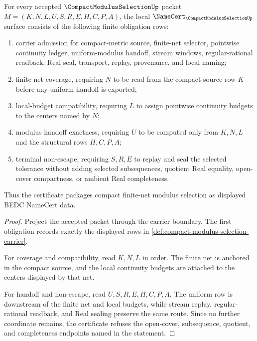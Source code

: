 \begin{theorem}
\label{thm:compact-modulus-selection-namecert}
For every accepted $\CompactModulusSelectionUp$ packet $M=(K,N,L,U,S,R,E,H,C,P,A)$, the local $\NameCert_{\CompactModulusSelectionUp}$ surface consists of the following finite obligation rows:
\begin{enumerate}
\item carrier admission for compact-metric source, finite-net selector, pointwise continuity ledger, uniform-modulus handoff, stream windows, regular-rational readback, Real seal, transport, replay, provenance, and local naming;
\item finite-net coverage, requiring $N$ to be read from the compact source row $K$ before any uniform handoff is exported;
\item local-budget compatibility, requiring $L$ to assign pointwise continuity budgets to the centers named by $N$;
\item modulus handoff exactness, requiring $U$ to be computed only from $K,N,L$ and the structural rows $H,C,P,A$;
\item terminal non-escape, requiring $S,R,E$ to replay and seal the selected tolerance without adding selected subsequences, quotient Real equality, open-cover compactness, or ambient Real completeness.
\end{enumerate}
Thus the certificate packages compact finite-net modulus selection as displayed BEDC NameCert data.
\end{theorem}
\begin{proof}
Project the accepted packet through the carrier boundary. The first obligation records exactly the displayed rows in \autoref{def:compact-modulus-selection-carrier}.

For coverage and compatibility, read $K,N,L$ in order. The finite net is anchored in the compact source, and the local continuity budgets are attached to the centers displayed by that net.

For handoff and non-escape, read $U,S,R,E,H,C,P,A$. The uniform row is downstream of the finite net and local budgets, while stream replay, regular-rational readback, and Real sealing preserve the same route. Since no further coordinate remains, the certificate refuses the open-cover, subsequence, quotient, and completeness endpoints named in the statement.
\end{proof}


